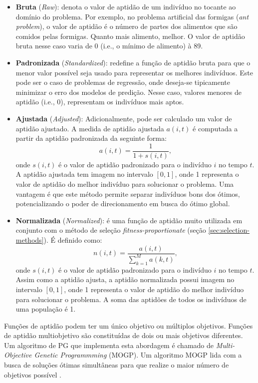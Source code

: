 \begin{itemize}
    \item \textbf{Bruta} (\textit{Raw}): denota o valor de aptidão de um indivíduo no tocante ao domínio do problema. Por exemplo, no problema artificial das formigas (\textit{ant problem}), o valor de aptidão é o número de partes dos alimentos que são comidos pelas formigas. Quanto mais alimento, melhor. O valor de aptidão bruta nesse caso varia de 0 (i.e., o mínimo de alimento) à 89.
    \item \textbf{Padronizada} (\textit{Standardized}): redefine a função de aptidão bruta para que o menor valor possível seja usado para representar os melhores indivíduos. Este pode ser o caso de problemas de regressão, onde deseja-se tipicamente minimizar o erro dos modelos de predição. Nesse caso, valores menores de aptidão (i.e., 0), representam os indivíduos mais aptos.
    \item \textbf{Ajustada} (\textit{Adjusted}): Adicionalmente, pode ser calculado um valor de aptidão ajustado. A medida de aptidão ajustada $a(i,t)$ é computada a partir da aptidão padronizada da seguinte forma:
        \[ a(i,t) = \frac{1}{1 + s(i,t)}, \]
    onde $s(i,t)$ é o valor de aptidão padronizado para o indivíduo $i$ no tempo $t$. A aptidão ajustada tem imagem no intervalo $[0, 1]$, onde 1 representa o valor de aptidão do melhor indivíduo para solucionar o problema. Uma vantagem é que este método permite separar indivíduos bons dos ótimos, potencializando o poder de direcionamento em busca do ótimo global.
    \item \textbf{Normalizada} (\textit{Normalized}): é uma função de aptidão muito utilizada em conjunto com o método de seleção \textit{fitness-proportionate} (seção \ref{sec:selection-methods}). É definido como:
        \[ n(i,t) = \frac{a(i,t)}{\sum_{k=1}^{M}{a(k,t)}}, \]
    onde $s(i,t)$ é o valor de aptidão padronizado para o indivíduo $i$ no tempo $t$. Assim como a aptidão ajusta, a aptidão normalizada possui imagem no intervalo $[0, 1]$, onde 1 representa o valor de aptidão do melhor indivíduo para solucionar o problema. A soma das aptidões de todos os indivíduos de uma população é 1.
\end{itemize}

Funções de aptidão podem ter um único objetivo ou múltiplos objetivos. Funções de aptidão multiobjetivo são constituídas de dois ou mais objetivos diferentes. Um algoritmo de PG que implementa esta abordagem é chamado de \textit{Multi-Objective Genetic Programmming} (MOGP). Um algoritmo MOGP lida com a busca de soluções ótimas simultâneas para que realize o maior número de objetivos possível \cite{poli2008}.

